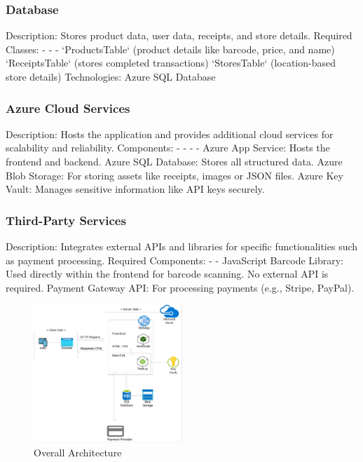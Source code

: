 \documentclass[conference]{IEEEtran}
\begin{document}
\subsubsection{Database}
Description: Stores product data, user data, receipts, and store details. 
Required Classes: - - - 
`ProductsTable` (product details like barcode, price, and name) 
`ReceiptsTable` (stores completed transactions) 
`StoresTable` (location-based store details) 
Technologies: Azure SQL Database 
\subsubsection{Azure Cloud Services}
Description: Hosts the application and provides additional cloud services for scalability 
and reliability. 
Components: - - - - 
Azure App Service: Hosts the frontend and backend. 
Azure SQL Database: Stores all structured data. 
Azure Blob Storage: For storing assets like receipts, images or JSON files. 
Azure Key Vault: Manages sensitive information like API keys securely. 
\subsubsection{Third-Party Services}
Description: Integrates external APIs and libraries for specific functionalities such as 
payment processing. 
Required Components: - - 
JavaScript Barcode Library: Used directly within the frontend for barcode 
scanning. No external API is required. 
Payment Gateway API: For processing payments (e.g., Stripe, PayPal).

\begin{figure}[H]  %
    \centering  %
    \includegraphics[width=0.5\textwidth]{architecture.jpg}  %
    \caption{Overall Architecture}  %
\end{figure}
\end{document}
